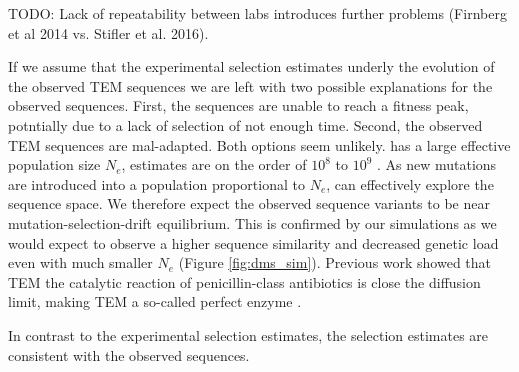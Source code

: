 \documentclass[12pt]{article}
\begin{document}
TODO:  Lack of repeatability between labs introduces further problems (Firnberg et al 2014 vs. Stifler et al. 2016).

If we assume that the experimental selection estimates underly the evolution of the observed TEM sequences we are left with two possible explanations for the observed sequences.
First, the sequences are unable to reach a fitness peak, potntially due to a lack of selection of not enough time.
Second, the observed TEM sequences are mal-adapted.
Both options seem unlikely.
\ecoli has a large effective population size $N_e$, estimates are on the order of $10^8$ to $10^9$ \citep{OchmanAndWilson1987, hartl1994}.
As new mutations are introduced into a population proportional to $N_e$, \ecoli can effectively explore the sequence space.
We therefore expect the observed sequence variants to be near mutation-selection-drift equilibrium.
This is confirmed by our simulations as we would expect to observe a higher sequence similarity and decreased genetic load even with much smaller $N_e$ (Figure \ref{fig:dms_sim}).
Previous work showed that TEM the catalytic reaction of penicillin-class antibiotics is close the diffusion limit, making TEM a so-called perfect enzyme \citep{matagne1998}.

In contrast to the experimental selection estimates, the \selac selection estimates are consistent with the observed sequences.
\end{document}
